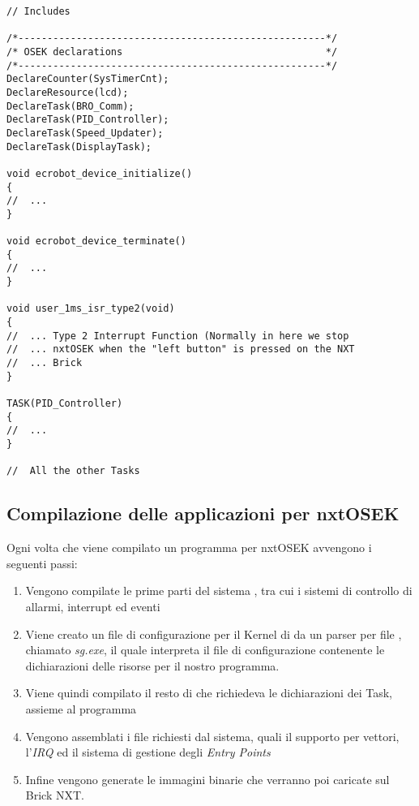 \begin{figure*}[htbp]
    \begin{lstlisting}[caption=Sample \nxtOSEK{} C structure,
                       label=lst:sampnxtc]
// Includes

/*-----------------------------------------------------*/
/* OSEK declarations                                   */
/*-----------------------------------------------------*/
DeclareCounter(SysTimerCnt);
DeclareResource(lcd);
DeclareTask(BRO_Comm);
DeclareTask(PID_Controller);
DeclareTask(Speed_Updater);
DeclareTask(DisplayTask);

void ecrobot_device_initialize()
{
//  ...
}

void ecrobot_device_terminate()
{
//  ...
}

void user_1ms_isr_type2(void)
{
//  ... Type 2 Interrupt Function (Normally in here we stop
//  ... nxtOSEK when the "left button" is pressed on the NXT
//  ... Brick
}

TASK(PID_Controller)
{
//  ...
}

//  All the other Tasks
    \end{lstlisting}
\end{figure*}

\subsection{Compilazione delle applicazioni per nxtOSEK}
Ogni volta che viene compilato un programma per nxtOSEK avvengono i
seguenti passi:
\begin{enumerate}
    \item Vengono compilate le prime parti del sistema \nxtOSEK{}, tra cui
        i sistemi di controllo di allarmi, interrupt ed eventi
    \item Viene creato un file di configurazione per il Kernel di
        \nxtOSEK{} da un parser per file , chiamato
        \emph{sg.exe}, il quale interpreta il file di configurazione
        contenente le dichiarazioni delle risorse per il nostro programma.
    \item Viene quindi compilato il resto di \nxtOSEK{} che richiedeva le
        dichiarazioni dei Task, assieme al programma
    \item Vengono assemblati i file  richiesti dal sistema,
        quali il supporto per vettori, l'\emph{IRQ} ed il sistema di
        gestione degli \emph{Entry Points}
    \item Infine vengono generate le immagini binarie che verranno poi
        caricate sul Brick NXT.
\end{enumerate}

